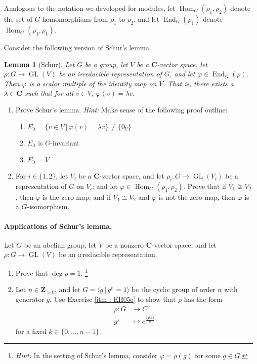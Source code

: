 \documentclass[oneside, english, 11pt]{article}
\newcommand{\fontField}[1]{\mathbf{#1}}
\newcommand{\fontHint}[1]{\emph{Hint:} #1}
\newcommand{\C}{\complexes}
\newcommand{\complexes}{\fontField{C}}
\DeclareMathOperator{\Endomorphisms}{End}
\DeclareMathOperator{\generalLinear}{GL}
\newcommand{\GL}{\generalLinear}
\DeclareMathOperator{\Hom}{Hom}
\newcommand{\integersPositive}{\fontField{Z}_{> 0}}
\newcommand{\iso}{\isomorphism}
\newcommand{\isomorphism}{\cong}
\newcommand{\st}{\, | \,}
\newtheorem{lemma}[theorem]{Lemma}
\begin{document}
Analogous to the notation we developed for modules, let $\Hom_{G}(\rho_{1}, \rho_{2})$ denote the set of $G$-homomorphisms from $\rho_{1}$ to $\rho_{2}$, and let $\Endomorphisms_{G}(\rho_{1})$ denote $\Hom_{G}(\rho_{1}, \rho_{1})$.

Consider the following version of Schur's lemma.

\begin{lemma}[Schur]
Let $G$ be a group, let $V$ be a $\C$-vector space, let $\rho : G \rightarrow \GL(V)$ be an irreducible representation of $G$, and let $\varphi \in \Endomorphisms_{G}(\rho)$. Then $\varphi$ is a scalar multiple of the identity map on $V$. That is, there exists a $\lambda \in \C$ such that for all $v \in V$, $\varphi(v) = \lambda v$.
\end{lemma}

\begin{enumerate}[resume, label=(\alph*)]
\item Prove Schur's lemma. \fontHint{Make sense of the following proof outline:
\begin{enumerate}[label=\arabic*.]
\item $E_{\lambda} = \{v \in V \st \varphi(v) = \lambda v\} \neq \{0_{V}\}$
\item $E_{\lambda}$ is $G$-invariant
\item $E_{\lambda} = V$
\end{enumerate}}
\item For $i \in \{1, 2\}$, let $V_{i}$ be a $\C$-vector space, and let $\rho_{i} : G \rightarrow \GL(V_{i})$ be a representation of $G$ on $V_{i}$; and let $\varphi \in \Hom_{G}(\rho_{1}, \rho_{2})$. Prove that if $V_{1} \not\iso V_{2}$, then $\varphi$ is the zero map; and if $V_{1} \iso V_{2}$ and $\varphi$ is not the zero map, then $\varphi$ is a $G$-isomorphism.
\end{enumerate}

\paragraph{Applications of Schur's lemma.}

Let $G$ be an abelian group, let $V$ be a nonzero $\C$-vector space, and let $\rho : G \rightarrow \GL(V)$ be an irreducible representation.

\begin{enumerate}[resume, label=(\alph*)]
\item\label{itm : EH05e} Prove that $\deg \rho = 1$.%
\footnote{\fontHint{In the setting of Schur's lemma, consider $\varphi = \rho(g)$ for some $g \in G$.}}%
\item Let $n \in \integersPositive$, and let $G = \langle{}g \st g^{n} = 1\rangle{}$ be the cyclic group of order $n$ with generator $g$. Use Exercise \ref{itm : EH05e} to show that $\rho$ has the form
\begin{align*}
\rho
:
G
&\rightarrow
C^{\times}
\\
g^{j}
&\mapsto
e^{\frac{2 j k \pi i}{n}}
\end{align*}
for a fixed $k \in \{0, \ldots, n - 1\}$.
\end{enumerate}
\end{document}
